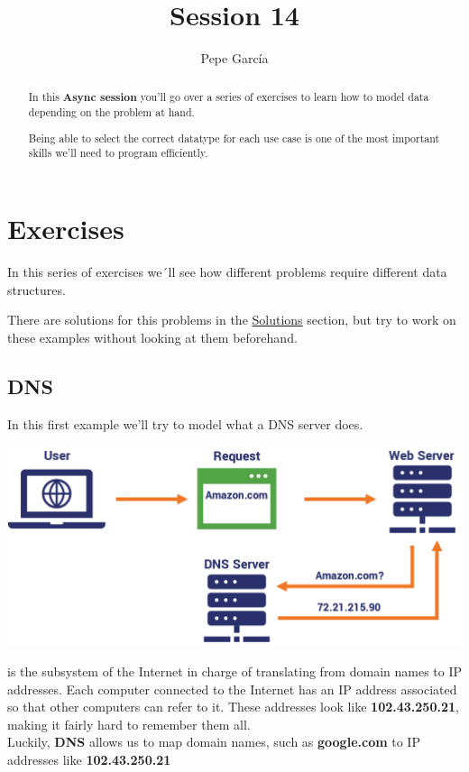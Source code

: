 \documentclass{tufte-handout}
\title{Session 14}
\author[Pepe García]{Pepe García}
\begin{document}
\maketitle%

\begin{abstract}
  \noindent
  In this \textbf{Async session} you'll go over a series of exercises to learn how to
  model data depending on the problem at hand.

  Being able to select the correct datatype for each use case is one of the most
  important skills we'll need to program efficiently.
\end{abstract}


\section{Exercises}\label{sec:exercises}

In this series of exercises we´ll see how different problems require different
data structures.

There are solutions for this problems in the \hyperref[sec:solutions]{Solutions}
section, but try to work on these examples without looking at them beforehand.

\pagebreak

\subsection{DNS}\label{sec:dns}

In this first example we'll try to model what a DNS server does.

\begin{marginfigure}%
  \includegraphics[width=\linewidth]{dns.png}
  \caption{ is the subsystem of the Internet in charge of
    translating from domain names to IP addresses.  Each computer connected to the
    Internet has an IP address associated so that other computers can refer to it.
    These addresses look like \textbf{102.43.250.21}, making it fairly hard to
    remember them all.\\Luckily, \textbf{DNS} allows us to map domain names, such as
    \textbf{google.com} to IP addresses like \textbf{102.43.250.21}}
  \label{fig:marginfig}
\end{marginfigure}
\end{document}
